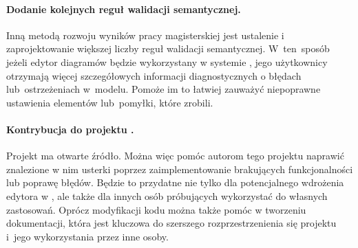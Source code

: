 \paragraph{Dodanie kolejnych reguł walidacji semantycznej.}
Inną metodą rozwoju wyników pracy magisterskiej jest ustalenie i
zaprojektowanie większej liczby reguł walidacji semantycznej. W~ten~sposób
jeżeli edytor diagramów będzie wykorzystany w systemie \BalticLSC{}, jego
użytkownicy otrzymają więcej szczegółowych informacji diagnostycznych o błędach
lub~ostrzeżeniach w~modelu. Pomoże im to łatwiej zauważyć niepoprawne
ustawienia elementów lub~pomyłki, które zrobili.

\paragraph{Kontrybucja do projektu \SiriusWeb{}.}
Projekt \SiriusWeb{} ma otwarte źródło. Można więc pomóc autorom tego
projektu naprawić znalezione w nim usterki poprzez zaimplementowanie
brakujących funkcjonalności lub poprawę błędów. Będzie to przydatne nie tylko
dla potencjalnego wdrożenia edytora w \BalticLSC{}, ale także dla innych
osób próbujących wykorzystać \SiriusWeb{} do własnych zastosowań.
Oprócz modyfikacji kodu można także pomóc w tworzeniu dokumentacji, która jest
kluczowa do szerszego rozprzestrzenienia się projektu i~jego wykorzystania
przez inne osoby.
